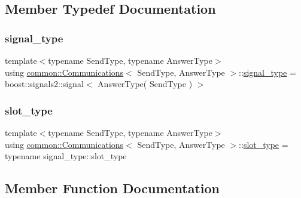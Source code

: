 \subsection{Member Typedef Documentation}
\mbox{\label{classcommon_1_1Communications_a5fcaf88c04bef4c16e4c55c2a712e492}} 
\subsubsection{\texorpdfstring{signal\+\_\+type}{signal\_type}}
{\footnotesize\ttfamily template$<$typename Send\+Type, typename Answer\+Type$>$ \\
using \mbox{\hyperlink{classcommon_1_1Communications}{common\+::\+Communications}}$<$ Send\+Type, Answer\+Type $>$\+::\mbox{\hyperlink{classcommon_1_1Communications_a5fcaf88c04bef4c16e4c55c2a712e492}{signal\+\_\+type}} =  boost\+::signals2\+::signal$<$ Answer\+Type( Send\+Type ) $>$\hspace{0.3cm}{\ttfamily [private]}}

\mbox{\label{classcommon_1_1Communications_ae7868817d46333a0221c80f9cfbaef6f}} 
\subsubsection{\texorpdfstring{slot\+\_\+type}{slot\_type}}
{\footnotesize\ttfamily template$<$typename Send\+Type, typename Answer\+Type$>$ \\
using \mbox{\hyperlink{classcommon_1_1Communications}{common\+::\+Communications}}$<$ Send\+Type, Answer\+Type $>$\+::\mbox{\hyperlink{classcommon_1_1Communications_ae7868817d46333a0221c80f9cfbaef6f}{slot\+\_\+type}} =  typename signal\+\_\+type\+::slot\+\_\+type\hspace{0.3cm}{\ttfamily [private]}}



\subsection{Member Function Documentation}
\mbox{\label{classcommon_1_1Communications_ac17b31727070e79b399f4a4021e17e36}} 
